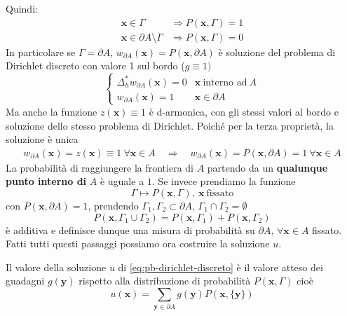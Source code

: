 \documentclass[10pt,a4paper,twoside,openright]{book}
\newcommand{\x}{\mathbf{x}}
\newcommand{\y}{\mathbf{y}}
\begin{document}
Quindi:
\begin{align*}
	\x\in \Gamma &\Rightarrow P(\x,\Gamma)=1\\
	\x\in \partial A\setminus\Gamma &\Rightarrow P(\x,\Gamma)=0
\end{align*}
In particolare se $\Gamma =\partial A$, $w_{\partial A}(\x) =P(\x,\partial A)$ è soluzione del problema di Dirichlet discreto con valore 1 sul bordo ($g\equiv 1)$
\begin{equation*}
	\begin{cases}
		\Delta ^{*}_{h} w_{\partial A}(\x) =0 & \x\ \text{interno ad} \ A \\
		w_{\partial A}(\x) =1              & \x\in \partial A          
	\end{cases}
\end{equation*}
Ma anche la funzione $z(\x) \equiv 1$ è d-armonica, con gli stessi valori al bordo e soluzione dello stesso problema di Dirichlet. Poiché per la terza proprietà, la soluzione è unica 
\begin{gather*}
	w_{\partial A}(\x) =z(\x) \equiv 1\ \forall \x\in A \quad \Rightarrow \quad w_{\partial A}(\x) =P(\x,\partial A) =1\ \forall \x\in A
\end{gather*}
La probabilità di raggiungere la frontiera di $A$ partendo da un \textbf{qualunque punto interno di} $A$ è uguale a $1$. Se invece prendiamo la funzione
\begin{equation*}
	\Gamma \longmapsto P(\x,\Gamma),\ \x\ \text{fissato}
\end{equation*}
con $P(\x,\partial A) =1$, prendendo $\Gamma _{1},\Gamma _{2} \subset \partial A$, $\Gamma _{1} \cap \Gamma _{2} =\emptyset $
\begin{equation*}
	P(\x,\Gamma _{1} \cup \Gamma _{2}) =P(\x,\Gamma _{1}) +P(\x,\Gamma _{2})
\end{equation*}
è additiva e definisce dunque una misura di probabilità su $\partial A$, $\forall \x\in A$ fissato. Fatti tutti questi passaggi possiamo ora costruire la soluzione $u$.
\begin{theorem}
	Il valore della soluzione $u$ di \eqref{eq:pb-dirichlet-discreto} è il valore atteso dei guadagni $g(\y)$ rispetto alla distribuzione di probabilità $P(\x,\Gamma)$ cioè
	\begin{equation*}
		u(\x) =\sum _{\y\in \partial A} g(\y) P(\x,\{\y\})
	\end{equation*}
\end{theorem}
\end{document}
